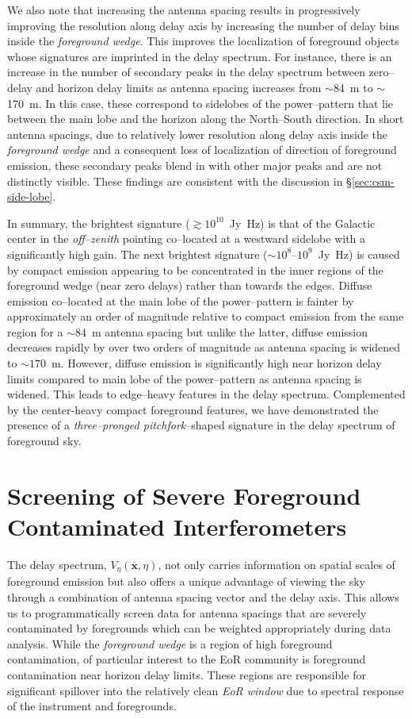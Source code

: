 \documentclass[preprint2,iop,numberedappendix]{emulateapj}
\begin{document}
We also note that increasing the antenna spacing results in progressively improving the resolution along delay axis by increasing the number of delay bins inside the {\it foreground wedge}. This improves the localization of foreground objects whose signatures are imprinted in the delay spectrum. For instance, there is an increase in the number of secondary peaks in the delay spectrum between zero--delay and horizon delay limits as antenna spacing increases from $\sim$84~m to $\sim$170~m. In this case, these correspond to sidelobes of the power--pattern that lie between the main lobe and the horizon along the North--South direction. In short antenna spacings, due to relatively lower resolution along delay axis inside the {\it foreground wedge} and a consequent loss of localization of direction of foreground emission, these secondary peaks blend in with other major peaks and are not distinctly visible. These findings are consistent with the discussion in \S\ref{sec:csm-side-lobe}.

In summary, the brightest signature ($\gtrsim 10^{10}$~Jy~Hz) is that of the Galactic center in the {\it off--zenith} pointing co--located at a westward sidelobe with a significantly high gain. The next brightest signature ($\sim 10^8$--$10^9$~Jy~Hz) is caused by compact emission appearing to be concentrated in the inner regions of the foreground wedge (near zero delays) rather than towards the edges. Diffuse emission co--located at the main lobe of the power--pattern is fainter by approximately an order of magnitude relative to compact emission from the same region for a $\sim 84$~m antenna spacing but unlike the latter, diffuse emission decreases rapidly by over two orders of magnitude as antenna spacing is widened to $\sim 170$~m. However, diffuse emission is significantly high near horizon delay limits compared to main lobe of the power--pattern as antenna spacing is widened. This leads to edge--heavy features in the delay spectrum. Complemented by the center-heavy compact foreground features, we have demonstrated the presence of a {\it three--pronged pitchfork}--shaped signature in the delay spectrum of foreground sky.

\section{Screening of Severe Foreground Contaminated Interferometers}\label{sec:fg-grading}

The delay spectrum, $V_\eta(\overline{\mathbf{x}},\eta)$, not only carries information on spatial scales of foreground emission but also offers a unique advantage of viewing the sky through a combination of antenna spacing vector and the delay axis. This allows us to programmatically screen data for antenna spacings that are severely contaminated by foregrounds which can be weighted appropriately during data analysis. While the {\it foreground wedge} is a region of high foreground contamination, of particular interest to the EoR community is foreground contamination near horizon delay limits. These regions are responsible for significant spillover into the relatively clean {\it EoR window} due to spectral response of the instrument and foregrounds. 
\end{document}
